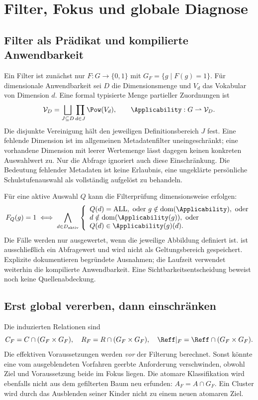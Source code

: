 \section{Filter, Fokus und globale Diagnose}
\label{sec:filters}
\subsection{Filter als Prädikat und kompilierte Anwendbarkeit}
Ein Filter ist zunächst nur $F:G\to\{0,1\}$ mit
$G_F=\{g\mid F(g)=1\}$. Für dimensionale Anwendbarkeit sei $D$
die Dimensionsmenge und $V_d$ das Vokabular von Dimension $d$. Eine
formal typisierte Menge partieller Zuordnungen ist
\[
 \mathcal V_D=\bigsqcup_{J\subseteq D}\prod_{d\in J}\Pow(V_d),\qquad
 \Applicability:G\rightharpoonup\mathcal V_D.
\]
Die disjunkte Vereinigung hält den jeweiligen Definitionsbereich $J$ fest.
Eine fehlende Dimension ist im allgemeinen Metadatenfilter uneingeschränkt;
eine vorhandene Dimension mit leerer Wertemenge lässt dagegen keinen
konkreten Auswahlwert zu. Nur die Abfrage  ignoriert auch diese
Einschränkung. Die Bedeutung fehlender Metadaten ist keine
Erlaubnis, eine ungeklärte persönliche Schulstufenauswahl als vollständig
aufgelöst zu behandeln.

Für eine aktive Auswahl $Q$ kann die Filterprüfung dimensionsweise erfolgen:
\[
 F_Q(g)=1\iff\bigwedge_{d\in D_{\mathrm{aktiv}}}
 \left\{
 \begin{array}{l}
 Q(d)=\mathrm{ALL},\ \text{oder}\ g\notin\operatorname{dom}(\Applicability),\ \text{oder}\\
 d\notin\operatorname{dom}(\Applicability(g)),\ \text{oder}\\
 Q(d)\in \Applicability(g)(d).
 \end{array}\right.
\]
Die Fälle werden nur ausgewertet, wenn die jeweilige Abbildung definiert
ist.  ist ausschließlich ein Abfragewert und wird nicht als
Geltungsbereich gespeichert. Explizite 
dokumentieren begründete Ausnahmen; die Laufzeit verwendet weiterhin die
kompilierte Anwendbarkeit. Eine Sichtbarkeitsentscheidung beweist noch keine
Quellenabdeckung.

\subsection{Erst global vererben, dann einschränken}
Die induzierten Relationen sind
\[
 C_F=C\cap(G_F\times G_F),\quad R_F=R\cap(G_F\times G_F),\quad
 \Reff|_F=\Reff\cap(G_F\times G_F).
\]
Die effektiven Voraussetzungen werden \emph{vor} der Filterung berechnet.
Sonst könnte eine vom ausgeblendeten Vorfahren geerbte Anforderung
verschwinden, obwohl Ziel und Voraussetzung beide im Fokus liegen.
Die atomare Klassifikation wird ebenfalls nicht aus dem gefilterten Baum
neu erfunden: $A_F=A\cap G_F$. Ein Cluster wird durch das Ausblenden
seiner Kinder nicht zu einem neuen atomaren Ziel.

